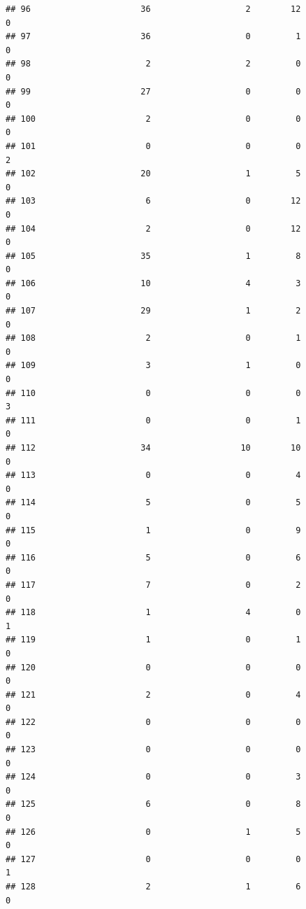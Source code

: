 \documentclass[
]{article}
\begin{document}
\begin{verbatim}
## 96                      36                   2        12                  0
## 97                      36                   0         1                  0
## 98                       2                   2         0                  0
## 99                      27                   0         0                  0
## 100                      2                   0         0                  0
## 101                      0                   0         0                  2
## 102                     20                   1         5                  0
## 103                      6                   0        12                  0
## 104                      2                   0        12                  0
## 105                     35                   1         8                  0
## 106                     10                   4         3                  0
## 107                     29                   1         2                  0
## 108                      2                   0         1                  0
## 109                      3                   1         0                  0
## 110                      0                   0         0                  3
## 111                      0                   0         1                  0
## 112                     34                  10        10                  0
## 113                      0                   0         4                  0
## 114                      5                   0         5                  0
## 115                      1                   0         9                  0
## 116                      5                   0         6                  0
## 117                      7                   0         2                  0
## 118                      1                   4         0                  1
## 119                      1                   0         1                  0
## 120                      0                   0         0                  0
## 121                      2                   0         4                  0
## 122                      0                   0         0                  0
## 123                      0                   0         0                  0
## 124                      0                   0         3                  0
## 125                      6                   0         8                  0
## 126                      0                   1         5                  0
## 127                      0                   0         0                  1
## 128                      2                   1         6                  0

\end{verbatim}
\end{document}
